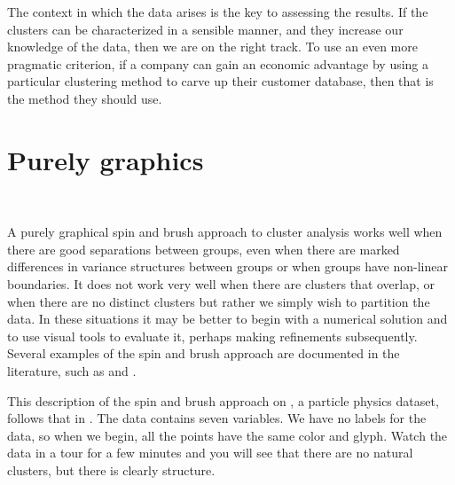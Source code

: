 The context in which the data arises is the key to 
assessing the results.  If the clusters can be characterized in a
sensible manner, and they increase our knowledge of the data, then
we are on the right track.  To use an even more pragmatic criterion, if
a company can gain an economic advantage by using a particular
clustering method to carve up their customer database, then that is the
method they should use.



\section{Purely graphics}~\label{clust-graphics}


A purely graphical spin and brush approach to cluster analysis works
well when there are good separations between groups, even when there
are marked differences in variance structures between groups or when
groups have non-linear boundaries. It does not work very well when
there are clusters that overlap, or when there are no distinct
clusters but rather we simply wish to partition the data. In these
situations it may be better to begin with a numerical solution and to
use visual tools to evaluate it, perhaps making refinements
subsequently.  Several examples of the spin and brush approach are
documented in the literature, such as  and
.


This description of the spin and brush approach on , a
particle physics dataset, follows that in . The
data contains seven variables.  We have no labels for the data, so
when we begin, all the points have the same color and glyph. Watch the
data in a tour for a few minutes and you will see that there are no
natural clusters, but there is clearly structure.


